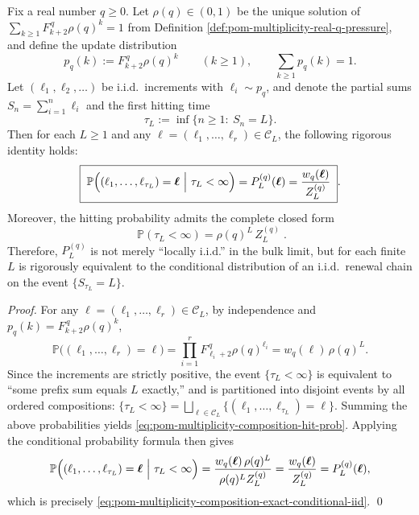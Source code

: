 \begin{theorem}\label{thm:pom-multiplicity-composition-exact-conditional-iid}
Fix a real number \(q\ge 0\).
Let \(\rho(q)\in(0,1)\) be the unique solution of
\(
\sum_{k\ge 1}F_{k+2}^{\,q}\rho(q)^k=1
\)
from Definition \ref{def:pom-multiplicity-real-q-pressure}, and define the update distribution
\[
p_q(k):=F_{k+2}^{\,q}\rho(q)^k\qquad(k\ge 1),
\qquad
\sum_{k\ge 1}p_q(k)=1.
\]
Let \((\ell_1,\ell_2,\dots)\) be i.i.d.\ increments with \(\ell_i\sim p_q\), and denote the partial sums \(S_n=\sum_{i=1}^n\ell_i\) and the first hitting time
\[
\tau_L:=\inf\{n\ge 1:\ S_n=L\}.
\]
Then for each \(L\ge 1\) and any \(\boldsymbol{\ell}=(\ell_1,\dots,\ell_r)\in\mathcal{C}_L\), the following rigorous identity holds:
\begin{equation}\label{eq:pom-multiplicity-composition-exact-conditional-iid}
\boxed{\;
\mathbb{P}\Bigl((\ell_1,\dots,\ell_{\tau_L})=\boldsymbol{\ell}\ \Big|\ \tau_L<\infty\Bigr)
=P_L^{(q)}(\boldsymbol{\ell})
=\frac{w_q(\boldsymbol{\ell})}{Z_L^{(q)}}\; }.
\end{equation}
Moreover, the hitting probability admits the complete closed form
\begin{equation}\label{eq:pom-multiplicity-composition-hit-prob}
\boxed{\;
\mathbb{P}(\tau_L<\infty)=\rho(q)^{L}\,Z_L^{(q)}\; }.
\end{equation}
Therefore, \(P_L^{(q)}\) is not merely ``locally i.i.d.'' in the bulk limit, but for each finite \(L\) is rigorously equivalent to the conditional distribution of an i.i.d.\ renewal chain on the event \(\{S_{\tau_L}=L\}\).
\end{theorem}
\begin{proof}
For any \(\boldsymbol{\ell}=(\ell_1,\dots,\ell_r)\in\mathcal{C}_L\), by independence and \(p_q(k)=F_{k+2}^{\,q}\rho(q)^k\),
\[
\mathbb{P}\bigl((\ell_1,\dots,\ell_r)=\boldsymbol{\ell}\bigr)
=\prod_{i=1}^r F_{\ell_i+2}^{\,q}\rho(q)^{\ell_i}
=w_q(\boldsymbol{\ell})\,\rho(q)^L.
\]
Since the increments are strictly positive, the event \(\{\tau_L<\infty\}\) is equivalent to ``some prefix sum equals \(L\) exactly,'' and is partitioned into disjoint events by all ordered compositions:
\(
\{\tau_L<\infty\}=\bigsqcup_{\boldsymbol{\ell}\in\mathcal{C}_L}\{(\ell_1,\dots,\ell_{\tau_L})=\boldsymbol{\ell}\}
\).
Summing the above probabilities yields \eqref{eq:pom-multiplicity-composition-hit-prob}.
Applying the conditional probability formula then gives
\[
\mathbb{P}\Bigl((\ell_1,\dots,\ell_{\tau_L})=\boldsymbol{\ell}\ \Big|\ \tau_L<\infty\Bigr)
=\frac{w_q(\boldsymbol{\ell})\,\rho(q)^L}{\rho(q)^L Z_L^{(q)}}
=\frac{w_q(\boldsymbol{\ell})}{Z_L^{(q)}}
=P_L^{(q)}(\boldsymbol{\ell}),
\]
which is precisely \eqref{eq:pom-multiplicity-composition-exact-conditional-iid}. \qed
\end{proof}

